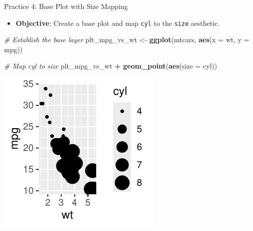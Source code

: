 \documentclass[
  ignorenonframetext,
]{beamer}
\newenvironment{Shaded}{\begin{snugshade}}{\end{snugshade}}
\newcommand{\AttributeTok}[1]{\textcolor[rgb]{0.13,0.29,0.53}{#1}}
\newcommand{\CommentTok}[1]{\textcolor[rgb]{0.56,0.35,0.01}{\textit{#1}}}
\newcommand{\FunctionTok}[1]{\textcolor[rgb]{0.13,0.29,0.53}{\textbf{#1}}}
\newcommand{\NormalTok}[1]{#1}
\newcommand{\OtherTok}[1]{\textcolor[rgb]{0.56,0.35,0.01}{#1}}
\newcommand{\SpecialCharTok}[1]{\textcolor[rgb]{0.81,0.36,0.00}{\textbf{#1}}}
\providecommand{\tightlist}{%
  \setlength{\itemsep}{0pt}\setlength{\parskip}{0pt}}
\begin{document}
\begin{frame}[fragile]{Practice 4: Base Plot with Size Mapping}
\label{practice-4-base-plot-with-size-mapping}
\begin{itemize}
\tightlist
\item
  \textbf{Objective}: Create a base plot and map \texttt{cyl} to the
  \texttt{size} aesthetic.
\end{itemize}

\begin{Shaded}
\begin{Highlighting}[]
\CommentTok{\# Establish the base layer}
\NormalTok{plt\_mpg\_vs\_wt }\OtherTok{\textless{}{-}} \FunctionTok{ggplot}\NormalTok{(mtcars, }\FunctionTok{aes}\NormalTok{(}\AttributeTok{x =}\NormalTok{ wt, }\AttributeTok{y =}\NormalTok{ mpg))}

\CommentTok{\# Map cyl to size}
\NormalTok{plt\_mpg\_vs\_wt }\SpecialCharTok{+} \FunctionTok{geom\_point}\NormalTok{(}\FunctionTok{aes}\NormalTok{(}\AttributeTok{size =}\NormalTok{ cyl))}
\end{Highlighting}
\end{Shaded}

\begin{center}\includegraphics[width=0.5\linewidth]{Figs/unnamed-chunk-17-1} \end{center}
\end{frame}
\end{document}
